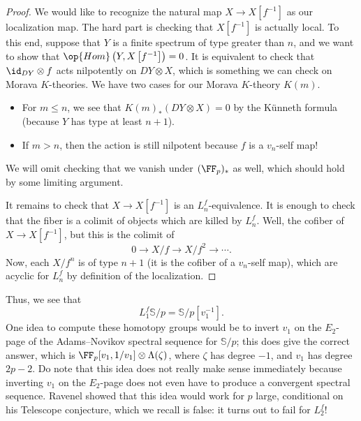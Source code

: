 \documentclass[../notes.tex]{subfiles}
\begin{document}
\begin{proof}
	We would like to recognize the natural map $X\to X\left[f^{-1}\right]$ as our localization map. The hard part is checking that $X\left[f^{-1}\right]$ is actually local. To this end, suppose that $Y$ is a finite spectrum of type greater than $n$, and we want to show that $\op{Hom}\left(Y,X\left[f^{-1}\right]\right)=0$. It is equivalent to check that $\id_{DY}\otimes f$ acts nilpotently on $DY\otimes X$, which is something we can check on Morava $K$-theories. We have two cases for our Morava $K$-theory $K(m)$.
	\begin{itemize}
		\item For $m\le n$, we see that $K(m)_*(DY\otimes X)=0$ by the K\"unneth formula (because $Y$ has type at least $n+1$).
		\item If $m>n$, then the action is still nilpotent because $f$ is a $v_n$-self map!
	\end{itemize}
	We will omit checking that we vanish under $(\FF_p)_*$ as well, which should hold by some limiting argument.

	It remains to check that $X\to X\left[f^{-1}\right]$ is an $L_n^f$-equivalence. It is enough to check that the fiber is a colimit of objects which are killed by $L_n^f$. Well, the cofiber of $X\to X\left[f^{-1}\right]$, but this is the colimit of
	\[0\to X/f\to X/f^2\to\cdots.\]
	Now, each $X/f^n$ is of type $n+1$ (it is the cofiber of a $v_n$-self map), which are acyclic for $L_n^f$ by definition of the localization.
\end{proof}
\begin{example}
	Thus, we see that
	\[L_1^f\mathbb S/p=\mathbb S/p\left[v_1^{-1}\right].\]
	One idea to compute these homotopy groups would be to invert $v_1$ on the $E_2$-page of the Adams--Novikov spectral sequence for $\mathbb S/p$; this does give the correct answer, which is $\FF_p[v_1,1/v_1]\otimes\Lambda(\zeta)$, where $\zeta$ has degree $-1$, and $v_1$ has degree $2p-2$. Do note that this idea does not really make sense immediately because inverting $v_1$ on the $E_2$-page does not even have to produce a convergent spectral sequence. Ravenel showed that this idea would work for $p$ large, conditional on his Telescope conjecture, which we recall is false: it turns out to fail for $L_2^f$!
\end{example}
\end{document}
